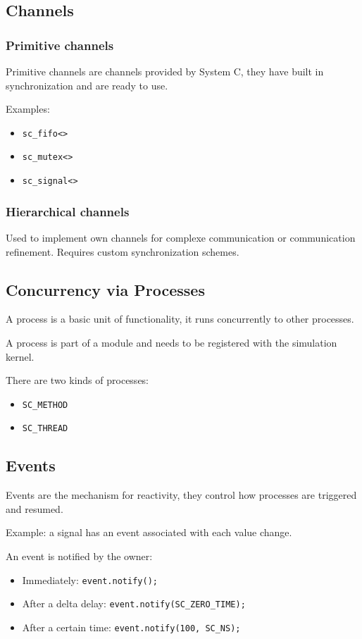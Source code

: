 \subsection{Channels}
\subsubsection{Primitive channels}
Primitive channels are channels provided by System C, they have built in synchronization and are ready to use.

Examples:
\begin{itemize}
    \item \lstinline{sc_fifo<>}
    \item \lstinline{sc_mutex<>}
    \item \lstinline{sc_signal<>}
\end{itemize}

\subsubsection{Hierarchical channels}
Used to implement own channels for complexe communication or communication refinement.
Requires custom synchronization schemes.

\subsection{Concurrency via Processes}
A process is a basic unit of functionality, it runs concurrently to other processes.

A process is part of a module and needs to be registered with the simulation kernel.

There are two kinds of processes:
\begin{itemize}
    \item \lstinline{SC_METHOD}
    \item \lstinline{SC_THREAD}
\end{itemize}

\subsection{Events}
Events are the mechanism for reactivity, they control how processes are triggered and resumed.

Example: a signal has an event associated with each value change.

An event is notified by the owner:
\begin{itemize}
    \item Immediately: \lstinline{event.notify();}
    \item After a delta delay: \lstinline{event.notify(SC_ZERO_TIME);}
    \item After a certain time: \lstinline{event.notify(100, SC_NS);}
\end{itemize}

